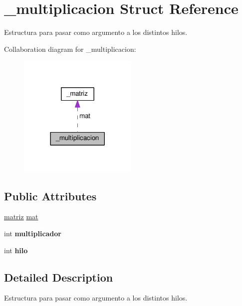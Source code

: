 \hypertarget{struct__multiplicacion}{}\section{\+\_\+multiplicacion Struct Reference}
\label{struct__multiplicacion}


Estructura para pasar como argumento a los distintos hilos.  




Collaboration diagram for \+\_\+multiplicacion\+:
\nopagebreak
\begin{figure}[H]
\begin{center}
\leavevmode
\includegraphics[width=161pt]{struct__multiplicacion__coll__graph}
\end{center}
\end{figure}
\subsection*{Public Attributes}
\begin{DoxyCompactItemize}
\item 
\hyperlink{Ejercicio13_8c_ac63a9b0c7cf4cdbaba641e8f59c29a51}{matriz} \hyperlink{struct__multiplicacion_abfec5d50833a74d0dcc94c685256055f}{mat}
\item 
int {\bfseries multiplicador}\hypertarget{struct__multiplicacion_a97c10b2d4068044f58f4e73a5822c530}{}\label{struct__multiplicacion_a97c10b2d4068044f58f4e73a5822c530}

\item 
int {\bfseries hilo}\hypertarget{struct__multiplicacion_a2143297ffc8eed6a5669b0bf30197371}{}\label{struct__multiplicacion_a2143297ffc8eed6a5669b0bf30197371}

\end{DoxyCompactItemize}


\subsection{Detailed Description}
Estructura para pasar como argumento a los distintos hilos. 


